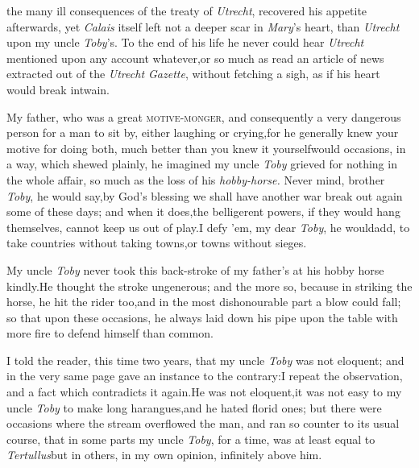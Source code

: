 \documentclass{article}
\begin{document}
 the many ill consequences of
the treaty of \textit{Utrecht}, 
recovered his appetite afterwards, yet \textit{Calais} itself left not a deeper
scar in \textit{Mary}’s heart, than \textit{Utrecht} upon my\break
uncle \textit{Toby}’s. To the end of his life he never could hear \textit{Utrecht} mentioned upon any
account whatever,\tsk or so much as read an article of news
extracted out of the \textit{Utrecht Gazette}, without fetching a
sigh, as if his heart would break in\break twain.

My father, who was a great \textsc{motive-monger}, and
consequently a very dangerous person for a man to sit by, either\break
laughing or crying,\tsk for he generally\break
knew your motive for doing both, much\break
better than you knew it yourself\tsk would\break
{}\break
occasions, in a way, which shewed\break
plainly, he imagined my uncle \textit{Toby}\break
grieved for nothing in the whole affair,\break
so much as the loss of his \textit{hobby-horse.}\break
\tsk Never mind, brother \textit{Toby}, he\break
would say,\tsk by God’s blessing we shall
have another
war break out again some of these days; and when it does,\tsk the
belligerent powers, if they would hang themselves, cannot keep us
out of play.\break\tsh I defy ’em, my dear \textit{Toby}, he
would\break add, to take countries without taking towns,\tsh or
towns without sieges.

My uncle \textit{Toby} never took this back-stroke of my
father’s at his hobby horse kindly.\tsh He thought
the stroke unge\-nerous; and the more so, because in striking the
horse, he hit the rider too,\break and in the most dishonourable part a
blow could fall; so that upon these oc\-casions, he always laid down
his pipe upon the table with more fire to defend himself than
common.

I told the reader, this time two years, that my uncle
\textit{Toby} was not eloquent; and in the very same page gave an
instance to the contrary:\tsh I repeat the observation,
and a fact which contradicts it again.\tsk He was not
eloquent,\tsk it was not easy to my uncle \textit{Toby} to make
long harangues,\tsk and he hated florid ones;\break
but there were occasions where the stream overflowed the man, and ran so counter to
its usual course, that in some parts my uncle \textit{Toby}, for a time, was at
least equal to \textit{Tertullus}\tsh but in others, in my own opinion, infinitely
above him.
\end{document}

